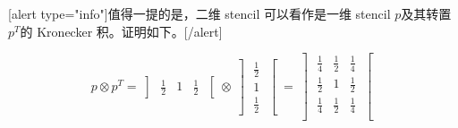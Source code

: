 \documentclass[12pt, UTF8, nofonts]{ctexart}
\begin{document}
[alert type="info"]值得一提的是，二维 stencil 可以看作是一维 stencil $p$及其转置$p^T$的 Kronecker 积。证明如下。[/alert]

\[
  p \otimes p^T =
  \left]\begin{matrix}
    \frac{1}{2} & 1 & \frac{1}{2}
  \end{matrix}\right[ \otimes
  \left]\begin{matrix}
    \frac{1}{2} \\ 1 \\ \frac{1}{2}
  \end{matrix}\right[ =
  \left]\begin{matrix}
    \frac{1}{4} & \frac{1}{2} & \frac{1}{4} \\
    \frac{1}{2} & 1 & \frac{1}{2} \\
    \frac{1}{4} & \frac{1}{2} & \frac{1}{4} \\
  \end{matrix}\right[
\]

\end{document}
